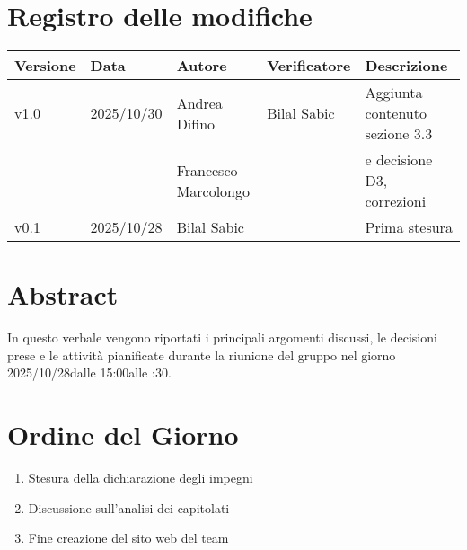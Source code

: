 \documentclass[a4paper,12pt]{article}
\newcommand{\DataVerbale}{2025/10/28}
\newcommand{\OraInizio}{15:00}
\newcommand{\OraFine}{16:30}
\newcommand{\AbstractVerbale}{%
In questo verbale vengono riportati i principali argomenti discussi, le decisioni prese e le attività pianificate durante la riunione del gruppo nel giorno \DataVerbale \space dalle \OraInizio \space alle \space \OraFine .
}
\newcommand{\VersioneVerbale}{v1.0} %
\begin{document}
\section*{Registro delle modifiche}{
    \begin{center} 
        \begin{tabular}{|l|l|l|l|l|}
            \hline
            \textbf{Versione} & \textbf{Data} & \textbf{Autore} & \textbf{Verificatore} & \textbf{Descrizione} \\
            \hline
            \VersioneVerbale & 2025/10/30 & Andrea Difino & Bilal Sabic & Aggiunta contenuto sezione 3.3 \\
            && Francesco Marcolongo && e decisione D3, correzioni \\
            \hline
            v0.1 & \DataVerbale & Bilal Sabic & & Prima stesura \\
            \hline
        \end{tabular}
    \end{center}
}

\newpage

\tableofcontents

\newpage
\section{Abstract}{
    \begin{minipage}{0.9\textwidth}
        \small
        \AbstractVerbale
    \end{minipage}
}


\section{Ordine del Giorno}{
    \begin{enumerate}
        \item Stesura della dichiarazione degli impegni
        \item Discussione sull'analisi dei capitolati
        \item Fine creazione del sito web del team
    \end{enumerate}
}
\end{document}
